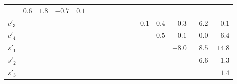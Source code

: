 \documentclass[aps,prd,superscriptaddress,nopreprintnumbers,nofootinbib,showpacs,floatfix]{revtex4}
\begin{document}
\begin{table}[htb]
\begin{center}
\begin{tabular}{lrrrrrrrrrrrrrrr}
&$  0.6 $ &$  1.8 $ &$ -0.7 $ &$  0.1 $ \\ 
$c'_3$&         &         &         &         &         &         &         &         &         &         &$ -0.1 $ %
&$  0.4 $ &$ -0.3 $ &$  6.2 $ &$  0.1 $ \\ 
$c'_4$&         &         &         &         &         &         &         &         &         &         &         %
&$  0.5 $ &$ -0.1 $ &$  0.0 $ &$  6.4 $ \\ 
$s'_1$&         &         &         &         &         &         &         &         &         &         &         %
&         &$ -8.0 $ &$  8.5 $ &$  14.8 $ \\
$s'_2$&         &         &         &         &         &         &         &         &         &         &         %
&         &         &$ -6.6 $ &$ -1.3 $ \\ 
$s'_3$&         &         &         &         &         &         &         &         &         &         &         %
&         &         &         &$  1.4 $ \\ 
\hline\hline
\end{tabular}
\end{center}
\end{table}
\end{document}
